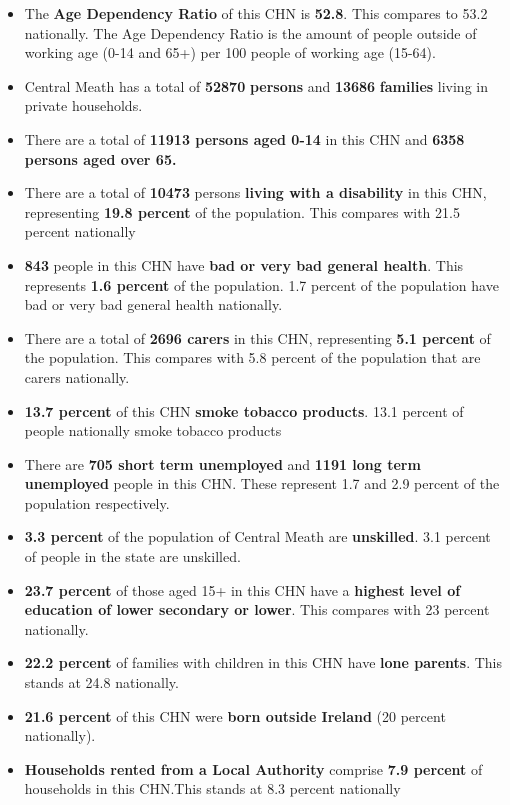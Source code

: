 \documentclass{article}
\begin{document}
\begin{itemize}

\item The \textbf{Age Dependency Ratio} of this CHN is  \textbf{52.8}. This compares to 53.2 nationally. The Age Dependency Ratio is the amount of people outside of working age (0-14 and 65+) per 100 people of working age (15-64). 

\item Central Meath has a total of \textbf{\num{52870}} \textbf{persons} and  \textbf{\num{13686}} \textbf{families} living in private households.

\item There are a total of \textbf{\num{11913} persons aged 0-14} in this CHN and \textbf{\num{6358} persons aged over 65.} 

\item There are a total of \textbf{\num{10473}} persons \textbf{living with a disability} in this CHN, representing \textbf{19.8 percent} of the population. This compares with  21.5 percent nationally

\item \textbf{\num{843}} people in this CHN have \textbf{bad or very bad general health}. This represents \textbf{1.6 percent} of the population. 1.7 percent of the population have bad or very bad general health nationally. 

\item There are a total of \textbf{\num{2696} carers} in this CHN, representing \textbf{5.1 percent} of the population. This compares with 5.8 percent of the population that are carers nationally. 

\item \textbf{13.7 percent} of this CHN \textbf{smoke tobacco products}. 13.1 percent of people nationally smoke tobacco products

\item There are \textbf{\num{705} short term unemployed} and \textbf{\num{1191} long term unemployed} people in this CHN. These represent 1.7 and 2.9 percent of the population respectively.

\item  \textbf{3.3 percent} of the population of Central Meath are \textbf{unskilled}. 3.1 percent of people in the state are unskilled.

\item \textbf{23.7 percent} of those aged 15+ in this CHN have a \textbf{highest level of education of lower secondary or lower}. This compares with 23 percent nationally. 

\item \textbf{22.2 percent} of families with children in this CHN have \textbf{lone parents}. This stands at 24.8 nationally.

\item \textbf{21.6 percent} of this CHN were \textbf{born outside Ireland} (20 percent nationally).

\item \textbf{Households rented from a Local Authority} comprise \textbf{7.9 percent} of households in this CHN.This stands at 8.3 percent nationally

\end{itemize}
\end{document}
